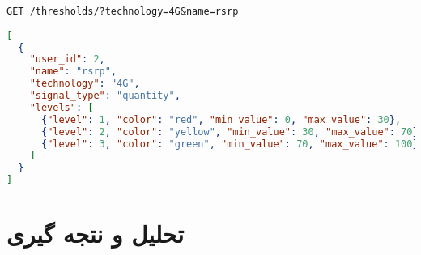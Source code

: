 \documentclass{report}
\begin{document}
\begin{center}
	\begin{latin}
		\texttt{GET /thresholds/?technology=4G\&name=rsrp}
	\end{latin}
\end{center}

\begin{lstlisting}[language=json]
[
  {
    "user_id": 2,
    "name": "rsrp",
    "technology": "4G",
    "signal_type": "quantity",
    "levels": [
      {"level": 1, "color": "red", "min_value": 0, "max_value": 30},
      {"level": 2, "color": "yellow", "min_value": 30, "max_value": 70},
      {"level": 3, "color": "green", "min_value": 70, "max_value": 100}
    ]
  }
]
\end{lstlisting}



\chapter{ }

\section{ }

\section{ }

\chapter{تحلیل و نتجه گیری}
 
\end{document}
